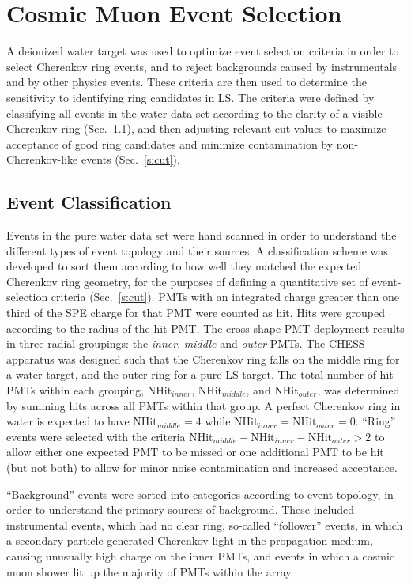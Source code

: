 \section{Cosmic Muon Event Selection}\label{s:event}

A deionized water target was used to optimize  event selection criteria in order to select Cherenkov ring events, and to reject backgrounds caused by instrumentals and by other physics events.  These criteria are then used to determine the sensitivity to identifying ring candidates in LS.  
The criteria were defined by classifying all events in the water data set according to the clarity of a visible Cherenkov ring (Sec.~\ref{s:class}), and then adjusting relevant cut values to maximize acceptance of good ring candidates and minimize contamination by non-Cherenkov-like events (Sec.~\ref{s:cut}).
 


\subsection{Event Classification}\label{s:class}
Events in the pure water data set were hand scanned in order to understand the different types of event topology and their sources.  A classification scheme was developed to sort them according to how well they matched 
the expected Cherenkov ring geometry, for the purposes of defining a quantitative set of event-selection criteria (Sec.~\ref{s:cut}). PMTs with an integrated charge greater than one third of the SPE charge for that PMT were counted as hit.  Hits were grouped according to the radius of the hit PMT.  The cross-shape PMT deployment results in three radial groupings: the \textit{ inner}, \textit{ middle} and \textit{ outer} PMTs.  The CHESS apparatus was designed such that the Cherenkov ring falls on the middle ring for a water target, and the outer ring for a pure LS target.  The total number of hit PMTs within each grouping, 
NHit$_{inner}$, NHit$_{middle}$, and NHit$_{outer}$, was determined by summing hits across all PMTs within that group. A perfect Cherenkov ring in water is expected to have NHit$_{middle} = 4$ while NHit$_{inner} = \mathrm{ NHit}_{outer} = 0$. ``Ring'' events were selected with the criteria NHit$_{middle} - \mathrm{ NHit}_{inner} - \mathrm{ NHit}_{outer} > 2$ to allow either one expected PMT to be missed or one additional PMT to be hit (but not both) to allow for minor noise contamination and increased acceptance.

``Background'' events were sorted into categories according to  event topology, in order to understand the primary sources of background.  These included instrumental events, which had no clear ring, so-called ``follower'' events, in which a secondary particle generated Cherenkov light in the propagation medium, causing unusually high charge on the inner PMTs, and events in which a cosmic muon shower lit up the majority of PMTs within the array.

